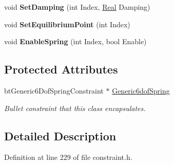 \begin{DoxyCompactItemize}
\item 
\hypertarget{classphys_1_1Generic6DofSpringConstraint_a045ada78452b640730d93b1a55a07ed0}{
void {\bfseries SetDamping} (int Index, \hyperlink{namespacephys_af7eb897198d265b8e868f45240230d5f}{Real} Damping)}
\label{d1/dc7/classphys_1_1Generic6DofSpringConstraint_a045ada78452b640730d93b1a55a07ed0}

\item 
\hypertarget{classphys_1_1Generic6DofSpringConstraint_a2a7fac22f3e47671c66bfd0fea085544}{
void {\bfseries SetEquilibriumPoint} (int Index)}
\label{d1/dc7/classphys_1_1Generic6DofSpringConstraint_a2a7fac22f3e47671c66bfd0fea085544}

\item 
\hypertarget{classphys_1_1Generic6DofSpringConstraint_ad25cb82744be6045c53d41fe6fb33051}{
void {\bfseries EnableSpring} (int Index, bool Enable)}
\label{d1/dc7/classphys_1_1Generic6DofSpringConstraint_ad25cb82744be6045c53d41fe6fb33051}

\end{DoxyCompactItemize}
\subsection*{Protected Attributes}
\begin{DoxyCompactItemize}
\item 
\hypertarget{classphys_1_1Generic6DofSpringConstraint_aaa3b34568d2402155270c102e4719c07}{
btGeneric6DofSpringConstraint $\ast$ \hyperlink{classphys_1_1Generic6DofSpringConstraint_aaa3b34568d2402155270c102e4719c07}{Generic6dofSpring}}
\label{d1/dc7/classphys_1_1Generic6DofSpringConstraint_aaa3b34568d2402155270c102e4719c07}

\begin{DoxyCompactList}\small\item\em Bullet constraint that this class encapsulates. \item\end{DoxyCompactList}\end{DoxyCompactItemize}


\subsection{Detailed Description}


Definition at line 229 of file constraint.h.



